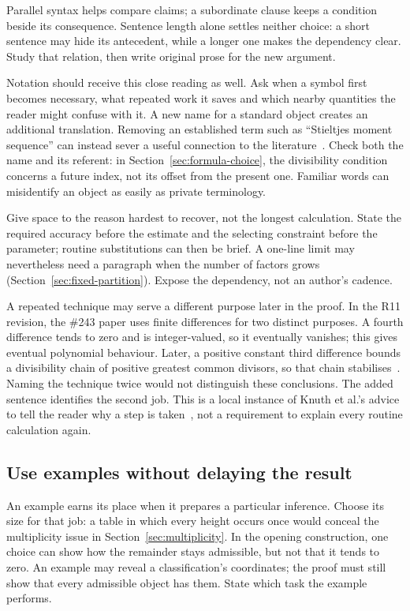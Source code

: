 Parallel syntax helps compare claims; a subordinate clause keeps a condition
beside its consequence. Sentence length alone settles neither choice: a short
sentence may hide its antecedent, while a longer one makes the dependency clear.
Study that relation, then write original prose for the new argument.

Notation should receive this close reading as well. Ask when a symbol first
becomes necessary, what repeated work it saves and which nearby quantities
the reader might confuse with it. A new name for a standard object creates an
additional translation. Removing an established term such as ``Stieltjes moment
sequence'' can instead sever a useful connection to the literature~\cite{wangzhu}.
Check both the name and its referent: in Section~\ref{sec:formula-choice}, the
divisibility condition concerns a future index, not its offset from the present
one. Familiar words can misidentify an object as easily as private terminology.

Give space to the reason hardest to recover, not the longest calculation.
State the required accuracy before the estimate and the selecting constraint
before the parameter; routine substitutions can then be brief. A one-line
limit may nevertheless need a paragraph when the number of factors grows
(Section~\ref{sec:fixed-partition}). Expose the dependency, not an author's cadence.

A repeated technique may serve a different purpose later in the proof. In the
R11 revision, the \#243 paper uses finite differences for two distinct purposes. A fourth
difference tends to zero and is integer-valued, so it eventually vanishes;
this gives eventual polynomial behaviour. Later, a positive constant third
difference bounds a divisibility chain of positive greatest common divisors,
so that chain stabilises~\cite[finite-difference argument]{paper243}. Naming
the technique twice would not distinguish these conclusions. The added
sentence identifies the second job. This is a local instance of Knuth et
al.'s advice to tell the reader why a step is taken~\cite[\S1, item~12]{knuth},
not a requirement to explain every routine calculation again.


\subsection{Use examples without delaying the result}

An example earns its place when it prepares a particular inference. Choose
its size for that job: a table in which every height occurs once would conceal
the multiplicity issue in Section~\ref{sec:multiplicity}. In the opening
construction, one choice can show how the remainder stays admissible, but not
that it tends to zero. An example may reveal a classification's coordinates;
the proof must still show that every admissible object has them. State which
task the example performs.

